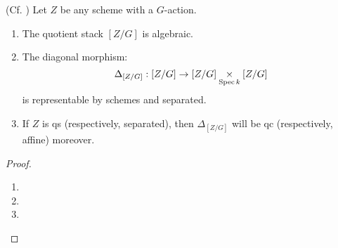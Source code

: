         \begin{proposition}
            (Cf. \cite[Theorem 2.0.2]{wang_algebraicity_of_Bun_G}) Let $Z$ be any scheme with a $G$-action.
            \begin{enumerate}
                \item The quotient stack $[Z/G]$ is algebraic.
                \item The diagonal morphism:
                    $$\Delta_{[Z/G]}: [Z/G] \to [Z/G] \x_{\Spec k} [Z/G]$$
                is representable by schemes and separated. 
                \item If $Z$ is qs (respectively, separated), then $\Delta_{[Z/G]}$ will be qc (respectively, affine) moreover.
            \end{enumerate}
        \end{proposition}
            \begin{proof}
                \begin{enumerate}
                    \item 
                    \item 
                    \item 
                \end{enumerate}
            \end{proof}